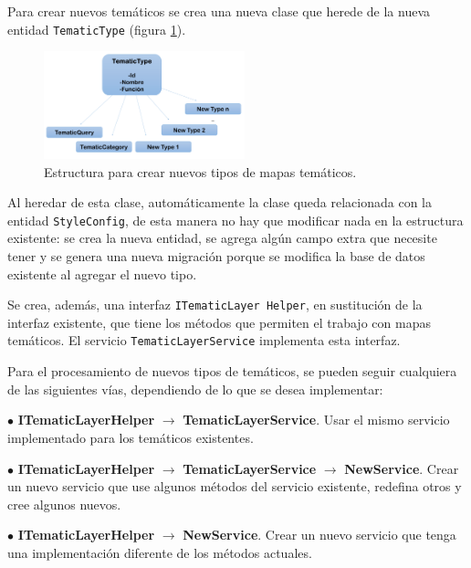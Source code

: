 Para crear nuevos tem\'aticos se crea una nueva clase que herede de la nueva entidad \texttt{TematicType} (figura \ref{nuevosTipos}). 

\begin{figure}
\vspace{-20pt}
\begin{center}
\includegraphics[width=0.52\textwidth]{images/newTematicTypes.png} 
\end{center} \vspace{-20pt} \caption{Estructura para crear nuevos tipos de mapas tem\'aticos.}  \label{nuevosTipos} \vspace{-10pt} 
\end{figure}

Al heredar de esta clase, autom\'aticamente la clase queda relacionada con la entidad \texttt{StyleConfig}, de esta manera no hay que modificar nada en la estructura existente: se crea la nueva entidad, se agrega alg\'un campo extra que necesite tener y se genera una nueva migraci\'on porque se modifica la base de datos existente al agregar el nuevo tipo.

Se crea, adem\'as, una interfaz \texttt{ITematicLayer Helper}, en sustituci\'on de la interfaz existente, que tiene los m\'etodos que permiten el trabajo con mapas tem\'aticos. El servicio \texttt{TematicLayerService} implementa esta interfaz. 

Para el procesamiento de nuevos tipos de tem\'aticos, se pueden seguir cualquiera de las siguientes v\'ias, dependiendo de lo que se desea implementar:

$\bullet$ \textbf{ITematicLayerHelper} $\rightarrow$ \textbf{TematicLayerService}. Usar el mismo servicio implementado para los tem\'aticos existentes.

$\bullet$ \textbf{ITematicLayerHelper} $\rightarrow$ \textbf{TematicLayerService} $\rightarrow$ \textbf{NewService}. Crear un nuevo servicio que use algunos m\'etodos del servicio existente, redefina otros y cree algunos nuevos.

$\bullet$ \textbf{ITematicLayerHelper} $\rightarrow$ \textbf{NewService}. Crear un nuevo servicio que tenga una implementaci\'on diferente de los m\'etodos actuales.

